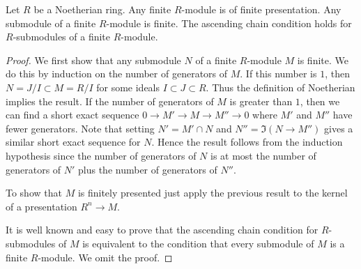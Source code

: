 \begin{lemma}
\label{lemma-Noetherian-basic}
Let $R$ be a Noetherian ring.
Any finite $R$-module is of finite presentation.
Any submodule of a finite $R$-module is finite.
The ascending chain condition holds for $R$-submodules
of a finite $R$-module.
\end{lemma}

\begin{proof}
We first show that any submodule $N$ of a finite $R$-module
$M$ is finite. We do this by induction on the number of
generators of $M$. If this number is $1$, then $N = J/I \subset
M = R/I$ for some ideals $I \subset J \subset R$. Thus the definition
of Noetherian implies the result. If the number of generators of
$M$ is greater than $1$, then we can find a short exact sequence
$0 \to M' \to M \to M'' \to 0$ where $M'$ and $M''$ have fewer
generators. Note that setting $N' = M' \cap N$ and $N'' = \Im(N \to
M'')$ gives a similar short exact sequence for $N$. Hence the result
follows from the induction hypothesis
since the number of generators of $N$ is at most the number of
generators of $N'$ plus the number of generators of $N''$.

\medskip\noindent
To show that $M$ is finitely presented just apply the previous result
to the kernel of a presentation $R^n \to M$.

\medskip\noindent
It is well known and easy to prove that the ascending chain condition for
$R$-submodules of $M$ is equivalent to the condition that every submodule
of $M$ is a finite $R$-module. We omit the proof.
\end{proof}